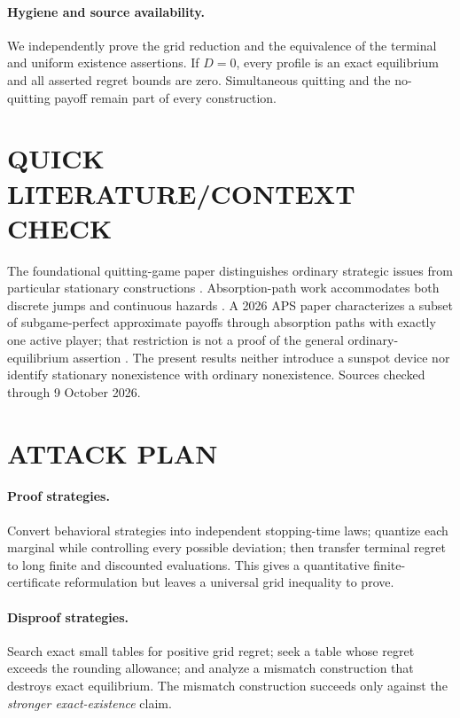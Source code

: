 \documentclass[11pt,a4paper]{article}
\theoremstyle{definition}
\theoremstyle{remark}
\begin{document}
\paragraph{Hygiene and source availability.}
We independently prove the grid reduction and the equivalence of the terminal and uniform existence assertions. If $D=0$, every profile is an exact equilibrium and all asserted regret bounds are zero. Simultaneous quitting and the no-quitting payoff remain part of every construction.

\section{QUICK LITERATURE/CONTEXT CHECK}
The foundational quitting-game paper distinguishes ordinary strategic issues from particular stationary constructions \cite{c7310-sv}. Absorption-path work accommodates both discrete jumps and continuous hazards \cite{c7310-ap}. A 2026 APS paper characterizes a subset of subgame-perfect approximate payoffs through absorption paths with exactly one active player; that restriction is not a proof of the general ordinary-equilibrium assertion \cite{c7310-aps}. The present results neither introduce a sunspot device nor identify stationary nonexistence with ordinary nonexistence. Sources checked through 9 October 2026.

\section{ATTACK PLAN}
\paragraph{Proof strategies.}
Convert behavioral strategies into independent stopping-time laws; quantize each marginal while controlling every possible deviation; then transfer terminal regret to long finite and discounted evaluations. This gives a quantitative finite-certificate reformulation but leaves a universal grid inequality to prove.

\paragraph{Disproof strategies.}
Search exact small tables for positive grid regret; seek a table whose regret exceeds the rounding allowance; and analyze a mismatch construction that destroys exact equilibrium. The mismatch construction succeeds only against the \emph{stronger exact-existence} claim.
\end{document}
